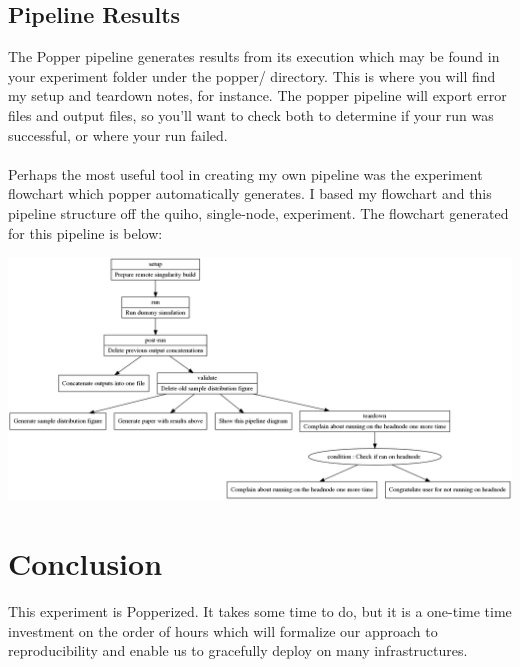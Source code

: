 \documentclass[12pt]{article}
\begin{document}
\subsection*{Pipeline Results}
The Popper pipeline generates results from its execution which may be found in your experiment folder under the popper/ directory. This is where you will find my setup and teardown notes, for instance. The popper pipeline will export error files and output files, so you'll want to check both to determine if your run was successful, or where your run failed.

\paragraph{}
Perhaps the most useful tool in creating my own pipeline was the experiment flowchart which popper automatically generates. I based my flowchart and this pipeline structure off the quiho, single-node, experiment. The flowchart generated for this pipeline is below:
\begin{center}
\includegraphics[scale=0.2]{../../wf.png}
\end{center}

\section*{Conclusion}
This experiment is Popperized. It takes some time to do, but it is a one-time time investment on the order of hours which will formalize our approach to reproducibility and enable us to gracefully deploy on many infrastructures.
\end{document}
